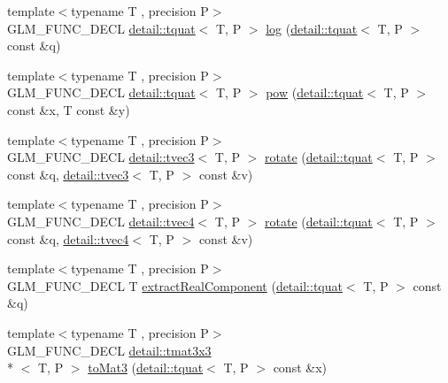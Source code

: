\begin{DoxyCompactItemize}
\item 
{\footnotesize template$<$typename T , precision P$>$ }\\G\-L\-M\-\_\-\-F\-U\-N\-C\-\_\-\-D\-E\-C\-L \hyperlink{structglm_1_1detail_1_1tquat}{detail\-::tquat}$<$ T, P $>$ \hyperlink{group__gtx__quaternion_ga832e6b69f9e5f596cad8bada9ebb4477}{log} (\hyperlink{structglm_1_1detail_1_1tquat}{detail\-::tquat}$<$ T, P $>$ const \&q)
\item 
{\footnotesize template$<$typename T , precision P$>$ }\\G\-L\-M\-\_\-\-F\-U\-N\-C\-\_\-\-D\-E\-C\-L \hyperlink{structglm_1_1detail_1_1tquat}{detail\-::tquat}$<$ T, P $>$ \hyperlink{group__gtx__quaternion_ga9c9854d641f71f853cfed9dc5d4ef762}{pow} (\hyperlink{structglm_1_1detail_1_1tquat}{detail\-::tquat}$<$ T, P $>$ const \&x, T const \&y)
\item 
{\footnotesize template$<$typename T , precision P$>$ }\\G\-L\-M\-\_\-\-F\-U\-N\-C\-\_\-\-D\-E\-C\-L \hyperlink{structglm_1_1detail_1_1tvec3}{detail\-::tvec3}$<$ T, P $>$ \hyperlink{group__gtx__quaternion_gaa4ac5806c1c001ac0247b1e1fd07dddf}{rotate} (\hyperlink{structglm_1_1detail_1_1tquat}{detail\-::tquat}$<$ T, P $>$ const \&q, \hyperlink{structglm_1_1detail_1_1tvec3}{detail\-::tvec3}$<$ T, P $>$ const \&v)
\item 
{\footnotesize template$<$typename T , precision P$>$ }\\G\-L\-M\-\_\-\-F\-U\-N\-C\-\_\-\-D\-E\-C\-L \hyperlink{structglm_1_1detail_1_1tvec4}{detail\-::tvec4}$<$ T, P $>$ \hyperlink{group__gtx__quaternion_ga3461e43b8c7da533b10bc5e9961add80}{rotate} (\hyperlink{structglm_1_1detail_1_1tquat}{detail\-::tquat}$<$ T, P $>$ const \&q, \hyperlink{structglm_1_1detail_1_1tvec4}{detail\-::tvec4}$<$ T, P $>$ const \&v)
\item 
{\footnotesize template$<$typename T , precision P$>$ }\\G\-L\-M\-\_\-\-F\-U\-N\-C\-\_\-\-D\-E\-C\-L T \hyperlink{group__gtx__quaternion_gaad86e595f0021253cb9d34ca32f27f3c}{extract\-Real\-Component} (\hyperlink{structglm_1_1detail_1_1tquat}{detail\-::tquat}$<$ T, P $>$ const \&q)
\item 
{\footnotesize template$<$typename T , precision P$>$ }\\G\-L\-M\-\_\-\-F\-U\-N\-C\-\_\-\-D\-E\-C\-L \hyperlink{structglm_1_1detail_1_1tmat3x3}{detail\-::tmat3x3}\\*
$<$ T, P $>$ \hyperlink{group__gtx__quaternion_ga9955d74e4bdcfec4039c5285c6e99d8f}{to\-Mat3} (\hyperlink{structglm_1_1detail_1_1tquat}{detail\-::tquat}$<$ T, P $>$ const \&x)

\end{DoxyCompactItemize}
